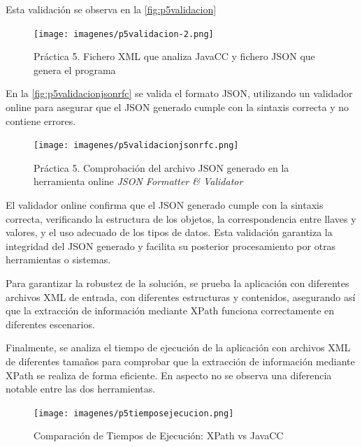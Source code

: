 Esta validación se observa en la \autoref{fig:p5validacion}


\begin{figure}[H]
	\centering
	\texttt{[image: imagenes/p5validacion-2.png]}
	\caption{\label{fig:p5validacion}Práctica 5. Fichero XML que analiza JavaCC y fichero JSON que genera el programa}
\end{figure}

En la \autoref{fig:p5validacionjsonrfc} se valida el formato JSON, utilizando un validador online para asegurar que el JSON generado cumple con la sintaxis correcta y no contiene errores.


\begin{figure}[H]
	\centering
	\texttt{[image: imagenes/p5validacionjsonrfc.png]}
	\caption{\label{fig:p5validacionjsonrfc}Práctica 5. Comprobación del archivo JSON generado en la herramienta online \textit{JSON Formatter \& Validator} }
\end{figure}

El validador online confirma que el JSON generado cumple con la sintaxis correcta, verificando la estructura de los objetos, la correspondencia entre llaves y valores, y el uso adecuado de los tipos de datos. Esta validación garantiza la integridad del JSON generado y facilita su posterior procesamiento por otras herramientas o sistemas.

Para garantizar la robustez de la solución, se prueba la aplicación con diferentes archivos XML de entrada, con diferentes estructuras y contenidos, asegurando así que la extracción de información mediante XPath funciona correctamente en diferentes escenarios.

Finalmente, se analiza el tiempo de ejecución de la aplicación con archivos XML de diferentes tamaños para comprobar que la extracción de información mediante XPath se realiza de forma eficiente. En aspecto no se observa una diferencia notable entre las dos herramientas.

\begin{figure}[H]
	\centering
	\texttt{[image: imagenes/p5tiemposejecucion.png]}
	\caption{\label{fig:p5tiemposejecucion}Comparación de Tiempos de Ejecución: XPath vs JavaCC}
\end{figure}


